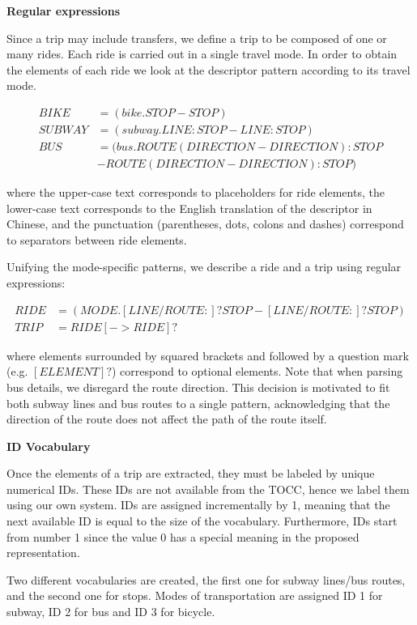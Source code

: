 \documentclass{article}
\begin{document}
\textbf{Regular expressions}

Since a trip may include transfers, we define a trip to be composed of one or many rides. Each ride is carried out in a single travel mode. In order to obtain the elements of each ride we look at the descriptor pattern according to its travel mode.

    \begin{align*}
    BIKE &= (bike.STOP-STOP) \\
    SUBWAY &= (subway.LINE:STOP-LINE:STOP) \\
    BUS &= (bus.ROUTE(DIRECTION-DIRECTION):STOP \\
    &-ROUTE(DIRECTION-DIRECTION):STOP)
	\end{align*}
	
where the upper-case text corresponds to placeholders for ride elements, the lower-case text corresponds to the English translation of the descriptor in Chinese, and the punctuation (parentheses, dots, colons and dashes) correspond to separators between ride elements.

Unifying the mode-specific patterns, we describe a ride and a trip using regular expressions:
    
	\begin{align*}	        
    RIDE &= (MODE.[LINE/ROUTE:]?STOP-[LINE/ROUTE:]?STOP) \\
    TRIP &= RIDE[->RIDE]? 
	\end{align*}    
	
where elements surrounded by squared brackets and followed by a question mark (e.g. $[ELEMENT]?$) correspond to optional elements. Note that when parsing bus details, we disregard the route direction. This decision is motivated to fit both subway lines and bus routes to a single pattern, acknowledging that the direction of the route does not affect the path of the route itself.

\textbf{ID Vocabulary}

Once the elements of a trip are extracted, they must be labeled by unique numerical IDs. These IDs are not available from the TOCC, hence we label them using our own system. IDs are assigned incrementally by 1, meaning that the next available ID is equal to the size of the vocabulary. Furthermore, IDs start from number 1 since the value 0 has a special meaning in the proposed representation.

Two different vocabularies are created, the first one for subway lines/bus routes, and the second one for stops. Modes of transportation are assigned ID 1 for subway, ID 2 for bus and ID 3 for bicycle.
\end{document}
